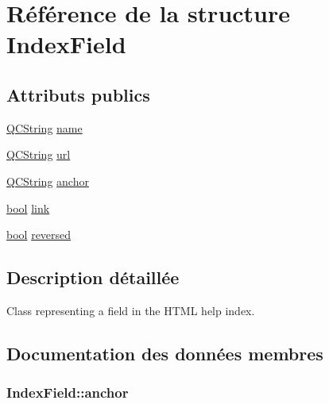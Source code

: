 \hypertarget{struct_index_field}{}\section{Référence de la structure Index\+Field}
\label{struct_index_field}
\subsection*{Attributs publics}
\begin{DoxyCompactItemize}
\item 
\hyperlink{class_q_c_string}{Q\+C\+String} \hyperlink{struct_index_field_af14ea53249ef3c89f95628f395dd4b99}{name}
\item 
\hyperlink{class_q_c_string}{Q\+C\+String} \hyperlink{struct_index_field_acc522969a4da3f635cce4bf571fdc9a0}{url}
\item 
\hyperlink{class_q_c_string}{Q\+C\+String} \hyperlink{struct_index_field_a9de1890d236dd42b05b310638cfeda4b}{anchor}
\item 
\hyperlink{qglobal_8h_a1062901a7428fdd9c7f180f5e01ea056}{bool} \hyperlink{struct_index_field_ace714325ef33d35456d4ccbf5dcf227f}{link}
\item 
\hyperlink{qglobal_8h_a1062901a7428fdd9c7f180f5e01ea056}{bool} \hyperlink{struct_index_field_a9cc482f75f35d70933dad31551f31b45}{reversed}
\end{DoxyCompactItemize}


\subsection{Description détaillée}
Class representing a field in the H\+T\+M\+L help index. 

\subsection{Documentation des données membres}
\hypertarget{struct_index_field_a9de1890d236dd42b05b310638cfeda4b}{}
\subsubsection[{anchor}]{ Index\+Field\+::anchor}\label{struct_index_field_a9de1890d236dd42b05b310638cfeda4b}
\hypertarget{struct_index_field_ace714325ef33d35456d4ccbf5dcf227f}{}
